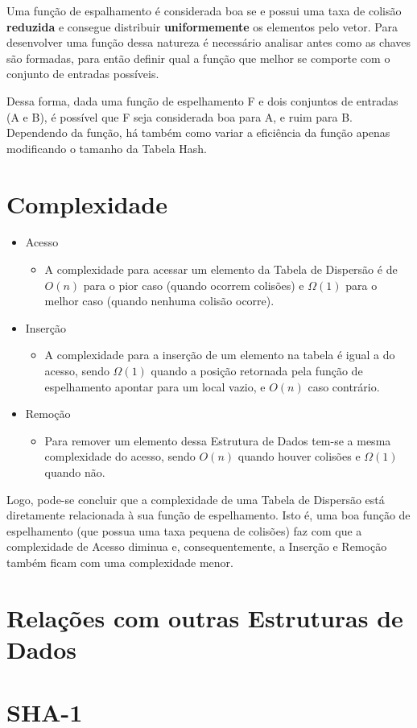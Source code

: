 \documentclass[12pt,openright,oneside,a4paper,english,brazil]{abntex2}
\begin{document}
    Uma função de espalhamento é considerada boa se e possui uma taxa de colisão \textbf{reduzida} e consegue distribuir \textbf{uniformemente} os elementos pelo vetor.
    Para desenvolver uma função dessa natureza é necessário analisar antes como as chaves são formadas, para então definir qual a função que melhor se comporte com o conjunto de entradas possíveis.

    Dessa forma, dada uma função de espelhamento F e dois conjuntos de entradas (A e B), é possível que F seja considerada boa para A, e ruim para B.
    Dependendo da função, há também como variar a eficiência da função apenas modificando o tamanho da Tabela Hash.

\section*{Complexidade}
    \begin{itemize}
        \item Acesso
        \begin{itemize}[label={}]
            \item A complexidade para acessar um elemento da Tabela de Dispersão é de $O(n)$ para o pior caso (quando ocorrem colisões) e $\Omega(1)$ para o melhor caso (quando nenhuma colisão ocorre).
        \end{itemize}
        \item Inserção
        \begin{itemize}[label={}]
            \item A complexidade para a inserção de um elemento na tabela é igual a do acesso, sendo $\Omega(1)$ quando a posição retornada pela função de espelhamento apontar para um local vazio, e $O(n)$ caso contrário.
        \end{itemize}
        \item Remoção
        \begin{itemize}[label={}]
            \item Para remover um elemento dessa Estrutura de Dados tem-se a mesma complexidade do acesso, sendo $O(n)$ quando houver colisões e $\Omega(1)$ quando não.
        \end{itemize}
    \end{itemize}

    Logo, pode-se concluir que a complexidade de uma Tabela de Dispersão está diretamente relacionada à sua função de espelhamento. Isto é, uma boa função de espelhamento (que possua uma taxa pequena de colisões) faz com que a complexidade de Acesso diminua e, consequentemente, a Inserção e Remoção também ficam com uma complexidade menor.

\section*{Relações com outras Estruturas de Dados}

\section*{SHA-1}
\end{document}
